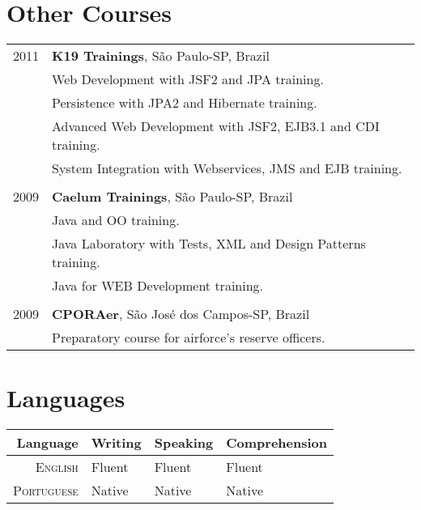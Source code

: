 \documentclass[a4paper,10pt]{article} %
\begin{document}
\section{Other Courses}

\begin{tabular}{r|p{11cm}}
2011 & \textbf{K19 Trainings}, São Paulo-SP, Brazil\\
    & \footnotesize{Web Development with JSF2 and JPA} training.\\
    & \footnotesize{Persistence with JPA2 and Hibernate} training.\\
    & \footnotesize{Advanced Web Development with JSF2, EJB3.1 and CDI} training.\\
    & \footnotesize{System Integration with Webservices, JMS and EJB} training.\\
    \multicolumn{2}{c}{}\\
    
2009 & \textbf{Caelum Trainings}, São Paulo-SP, Brazil\\
    & \footnotesize{Java and OO} training.\\
    & \footnotesize{Java Laboratory with Tests, XML and Design Patterns} training.\\
    & \footnotesize{Java for WEB Development} training.\\
    \multicolumn{2}{c}{}\\

2009 & \textbf{CPORAer}, São José dos Campos-SP, Brazil\\
    & \footnotesize{Preparatory course for airforce's reserve officers}.\\

\end{tabular}


\section{Languages}

\begin{tabular}{r|lll}
Language &  Writing & Speaking & Comprehension \\
\hline
\textsc{English} & Fluent & Fluent & Fluent \\ 

\textsc{Portuguese} & Native & Native & Native \\
\end{tabular}
\end{document}
